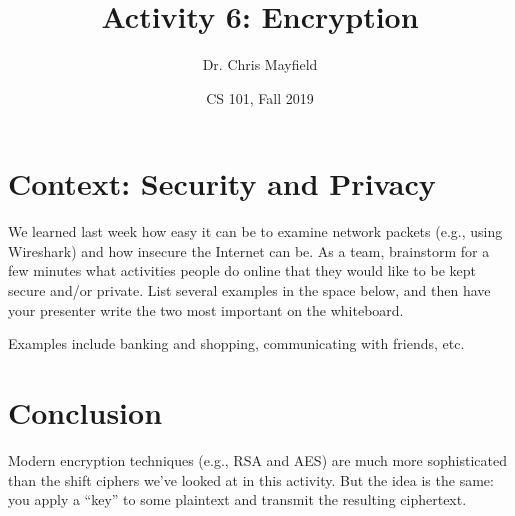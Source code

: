 \documentclass[12pt]{article}
\title{Activity 6: Encryption}
\author{Dr. Chris Mayfield}
\date{CS 101, Fall 2019}
\begin{document}
\maketitle

\section*{Context: Security and Privacy}

We learned last week how easy it can be to examine network packets (e.g., using Wireshark) and how insecure the Internet can be.
As a team, brainstorm for a few minutes what activities people do online that they would like to be kept secure and/or private.
List several examples in the space below, and then have your presenter write the two most important on the whiteboard.

\vspace{1ex}
\begin{answer}[12em]
Examples include banking and shopping, communicating with friends, etc.
\end{answer}





\newpage



\vfill

\section*{Conclusion}

Modern encryption techniques (e.g., RSA and AES) are much more sophisticated than the shift ciphers we've looked at in this activity.
But the idea is the same: you apply a ``key'' to some plaintext and transmit the resulting ciphertext.
\end{document}
